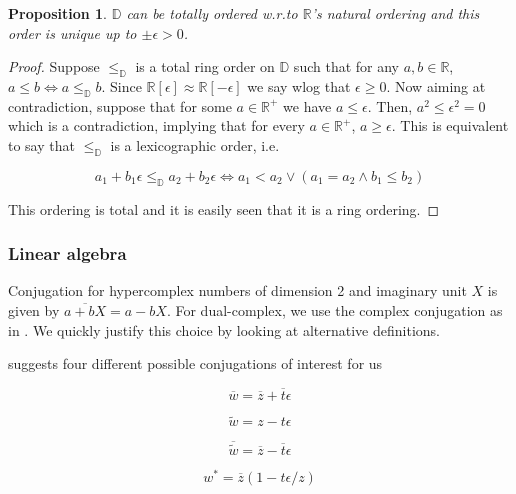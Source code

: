 \documentclass{article}
\newtheorem{proposition}[theorem]{Proposition}
\newcommand{\R}{\mathbb{R}}
\newcommand{\D}{\mathbb{D}}
\newcommand{\e}{\epsilon}
\newcommand{\til}{\widetilde}
\renewcommand{\bar}{\overline}
\begin{document}
\begin{proposition}
 $\D$ can be totally ordered w.r.\@ to $\R$'s natural ordering and this order is unique up to $\pm \e > 0$.
\end{proposition}
\begin{proof}
Suppose $\leq_\D$ is a total ring order on $\D$ such that for any $a, b \in \R$, $a \leq b \iff a \leq_\D b$. Since $\R[\e] \approx \R[-\e]$ we say wlog that $\e \geq 0$. Now aiming at contradiction, suppose that for some $a \in \R^+$ we have $a \leq \e$. Then, $a^2 \leq \e^2 = 0$ which is a contradiction, implying that for every $a \in \R^+$, $a \geq \e$. This is equivalent to say that $\leq_\D$ is a lexicographic order, i.e.\

\begin{equation}
a_1 + b_1 \e \leq_\D a_2 + b_2 \e \iff a_1 < a_2 \lor (a_1 = a_2 \land b_1 \leq b_2)
\end{equation}

This ordering is total and it is easily seen that it is a ring ordering.
\end{proof}

\subsubsection*{Linear algebra}

\noindent Conjugation for hypercomplex numbers of dimension 2 and imaginary unit $X$ is given by $\bar{a + bX} = a - bX$. For dual-complex, we use the complex conjugation as in \cite{qi2023}. We quickly justify this choice by looking at alternative definitions.

\cite{messelmi2015} suggests four different possible conjugations of interest for us

\begin{multicols}{4}
\noindent \begin{equation}
\bar{w} = \bar{z} + \bar{t}\e
\end{equation}

\columnbreak

\noindent \begin{equation}
\til{w} = z - t\e
\end{equation}

\columnbreak

\noindent \begin{equation}
\bar{\til{w}} = \bar{z} - \bar{t}\e
\end{equation}

\columnbreak

\noindent \begin{equation}
w^* = \bar{z}(1-t\e/z)
\end{equation}
\end{multicols}
\end{document}
